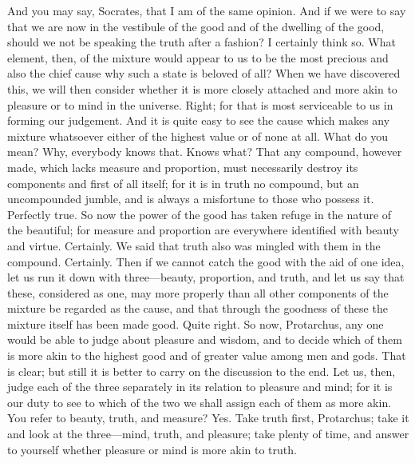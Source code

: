 \documentclass[letterpaper,12pt]{article}
\newcommand{\stephpag}[1]{\marginnote{\small\itshape\fontfamily{ppl}\selectfont #1}}
\begin{document}
\begin{drama}
And you may say, Socrates, that I am of the same opinion. \stephpag{c}
\socratesspeaks
And if we were to say that we are now in the vestibule of the good and of the dwelling of the good, should we not be speaking the truth after a fashion?
\protarchusspeaks
I certainly think so.
\socratesspeaks
What element, then, of the mixture would appear to us to be the most precious and also the chief cause why such a state is beloved of all? When we have discovered this, we will then consider whether it is more closely attached and more akin to pleasure or to mind in the universe. \stephpag{d}
\protarchusspeaks
Right; for that is most serviceable to us in forming our judgement.
\socratesspeaks
And it is quite easy to see the cause which makes any mixture whatsoever either of the highest value or of none at all.
\protarchusspeaks
What do you mean?
\socratesspeaks
Why, everybody knows that.
\protarchusspeaks
Knows what?
\socratesspeaks
That any compound, however made, which lacks measure and proportion, must necessarily destroy its components and first of all itself; \stephpag{e} for it is in truth no compound, but an uncompounded jumble, and is always a misfortune to those who possess it.
\protarchusspeaks
Perfectly true.
\socratesspeaks
So now the power of the good has taken refuge in the nature of the beautiful; for measure and proportion are everywhere identified with beauty and virtue.
\protarchusspeaks
Certainly.
\socratesspeaks
We said that truth also was mingled with them in the compound.
\protarchusspeaks
Certainly.
\socratesspeaks
Then if we cannot catch the good with the aid of one idea, \stephpag{65 a} let us run it down with three---beauty, proportion, and truth, and let us say that these, considered as one, may more properly than all other components of the mixture be regarded as the cause, and that through the goodness of these the mixture itself has been made good.
\protarchusspeaks
Quite right.
\socratesspeaks
So now, Protarchus, any one would be able to judge about pleasure and wisdom, \stephpag{b} and to decide which of them is more akin to the highest good and of greater value among men and gods.
\protarchusspeaks
That is clear; but still it is better to carry on the discussion to the end.
\socratesspeaks
Let us, then, judge each of the three separately in its relation to pleasure and mind; for it is our duty to see to which of the two we shall assign each of them as more akin.
\protarchusspeaks
You refer to beauty, truth, and measure?
\socratesspeaks
Yes. Take truth first, Protarchus; take it and look at the three---mind, truth, \stephpag{c} and pleasure; take plenty of time, and answer to yourself whether pleasure or mind is more akin to truth.

\end{drama}
\end{document}
